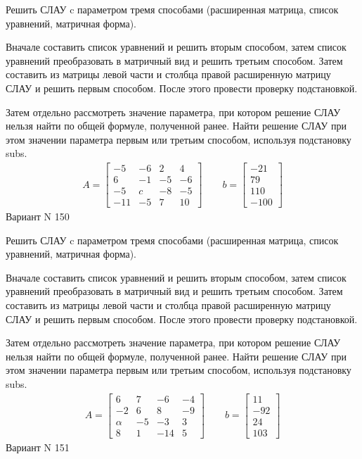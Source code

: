 \documentclass[11pt]{report}
\begin{document}
Решить СЛАУ c параметром тремя способами (расширенная матрица, список уравнений, матричная форма).

Вначале составить список уравнений и решить вторым способом,
затем список уравнений преобразовать в матричный вид и решить третьим способом.
Затем составить из матрицы левой части и столбца правой расширенную матрицу СЛАУ и решить первым способом.
После этого провести проверку подстановкой.

Затем отдельно рассмотреть значение параметра, при котором решение СЛАУ нельзя найти по общей формуле,
полученной ранее.
Найти решение СЛАУ при этом значении параметра первым или третьим способом, используя подстановку subs.
\begin{align*}
    A = \left[\begin{matrix}-5 & -6 & 2 & 4\\6 & -1 & -5 & -6\\-5 & c & -8 & -5\\-11 & -5 & 7 & 10\end{matrix}\right]
\qquad b = \left[\begin{matrix}-21\\79\\110\\-100\end{matrix}\right]
\end{align*}
\newpage
Вариант N 150


Решить СЛАУ c параметром тремя способами (расширенная матрица, список уравнений, матричная форма).

Вначале составить список уравнений и решить вторым способом,
затем список уравнений преобразовать в матричный вид и решить третьим способом.
Затем составить из матрицы левой части и столбца правой расширенную матрицу СЛАУ и решить первым способом.
После этого провести проверку подстановкой.

Затем отдельно рассмотреть значение параметра, при котором решение СЛАУ нельзя найти по общей формуле,
полученной ранее.
Найти решение СЛАУ при этом значении параметра первым или третьим способом, используя подстановку subs.
\begin{align*}
    A = \left[\begin{matrix}6 & 7 & -6 & -4\\-2 & 6 & 8 & -9\\\alpha & -5 & -3 & 3\\8 & 1 & -14 & 5\end{matrix}\right]
\qquad b = \left[\begin{matrix}11\\-92\\24\\103\end{matrix}\right]
\end{align*}
\newpage
Вариант N 151
\end{document}
